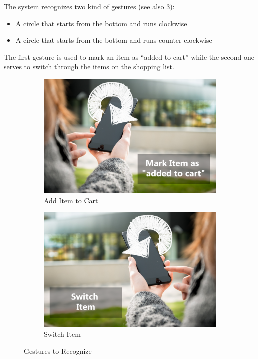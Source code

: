 The system recognizes two kind of gestures (see also
\ref{fig:gesturesToRecognize}):
\begin{itemize}
  \item A circle that starts from the bottom and runs clockwise
  \item A circle that starts from the bottom and runs counter-clockwise
\end{itemize}
The first gesture is used to mark an item as ``added to cart'' while the second
one serves to switch through the items on the shopping list.

\begin{figure}[h]
\captionsetup{justification=centering}
\begin{subfigure}{0.475\textwidth}
\includegraphics[width=\textwidth]{res/gestures/addToCart.png}
\caption{Add Item to Cart}
\label{fig:gestureAdd}
\end{subfigure} \hspace{0.05\textwidth}
\begin{subfigure}{0.475\textwidth}
\includegraphics[width=\textwidth]{res/gestures/removeFromCart.png}
\caption{Switch Item}
\label{fig:gestureRemove}
\end{subfigure}
\caption{Gestures to Recognize}
\label{fig:gesturesToRecognize}
\end{figure}

